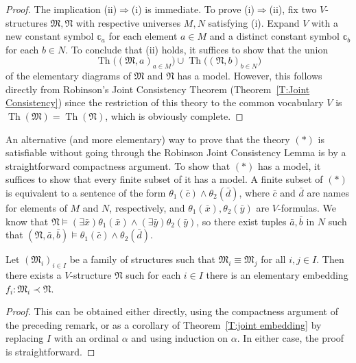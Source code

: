\documentclass{scrartcl}
\DeclareMathOperator{\Th}{Th}
\newcommand{\FM}{\mathfrak{M}}
\newcommand{\FN}{\mathfrak{N}}
\begin{document}
\begin{proof}
The implication (ii)$\Rightarrow$(i) is immediate. To prove (i)$\Rightarrow$(ii), fix two $V$-structures $\FM,\FN$ with respective universes $M,N$ satisfying (i). Expand $V$ with a new constant symbol $\mathbb{c}_a$ for each element $a\in M$ and a distinct constant symbol $\mathbb{c}_b$ for each $b\in N$. To conclude that (ii) holds, it suffices to show that the union 
\[
\tag{*}
\Th\big((\FM,a)_{a\in M}\big)
\cup
\Th\big((\FN,b)_{b\in N}\big)
\]
of the elementary diagrams of $\FM$ and $\FN$ has a model. However, this follows directly from Robinson's Joint Consistency Theorem (Theorem~\ref{T:Joint Consistency}) since the restriction of this theory to the common vocabulary $V$ is $\Th(\FM) =\Th(\FN)$,
which is obviously complete.
\end{proof}

\begin{remark}
An alternative (and more elementary) way to prove that the theory $(*)$ is satisfiable without going through the Robinson Joint Consistency Lemma  is by a straightforward compactness argument. To show that $(*)$ has a model, it suffices to show that every finite subset of it has a model. A finite subset of $(*)$ is equivalent to a sentence of the form $\theta_1(\bar{c})\land\theta_2(\bar d)$, where $\bar{c}$ and $\bar{d}$ are names for elements of $M$ and $N$, respectively, and $\theta_1(\bar x),\theta_2(\bar y)$ are $V$-formulas. We know that $\FN\models (\exists \bar{x}) \theta_1(\bar x)\land(\exists\bar{y})\theta_2(\bar y)$, so there exist tuples $\bar{a},\bar{b}$ in $N$ such that $(\FN, \bar{a},\bar{b})\models \theta_1(\bar{c})\land\theta_2(\bar d)$.
\end{remark}



\begin{theorem}
\label{T:joint embedding strong}
Let $(\FM_i)_{i\in I}$ be a family of structures such that $\FM_i\equiv\FM_j$ for all $i,j\in I$. Then there exists a $V$-structure $\FN$ such for each $i\in I$ there is an elementary embedding $f_i:\FM_i \prec \FN$.

\end{theorem}

\begin{proof}
This can be obtained either directly,  using the compactness argument of the preceding remark, or as a corollary of Theorem~\ref{T:joint embedding} by replacing $I$ with an ordinal $\alpha$ and using induction on $\alpha$. In either case, the proof is straightforward.
\end{proof}
\end{document}
